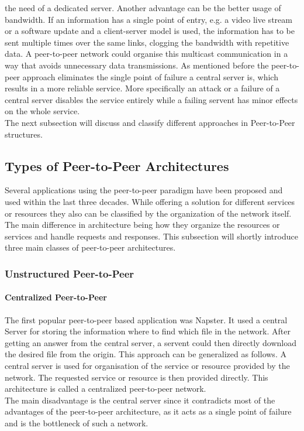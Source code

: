 the need of a dedicated server. Another advantage can be the better
usage of bandwidth. If an information has a single point of entry,
e.g. a video live stream or a software update and a client-server model is used,
the information has to be sent multiple times over the same links, clogging the
bandwidth with repetitive data. A peer-to-peer network could organise this
multicast communication in a way that avoids unnecessary data transmissions. As
mentioned before the peer-to-peer approach eliminates the single point of
failure a central server is, which results in a more reliable service. More
specifically an attack or a failure of a central server disables the service
entirely while a failing servent has minor effects on the whole service.
\\
The next subsection will discuss and classify different approaches in Peer-to-Peer
structures.
\subsection{Types of Peer-to-Peer Architectures}
Several applications using the peer-to-peer paradigm have been proposed and used
within the last three decades. While offering a solution for different services
or resources they also can be classified by the organization of the network
itself. The main difference in architecture being how they organize the
resources or services and handle requests and responses. This subsection will
shortly introduce three main classes of peer-to-peer architectures.
\subsubsection{Unstructured Peer-to-Peer}
\paragraph{Centralized Peer-to-Peer}
The first popular peer-to-peer based application was Napster. It used a
central Server for storing the information where to find which file in the
network. After getting an answer from the central server, a servent could then
directly download the desired file from the origin. This approach can be
generalized as follows. A central server is used for organisation
of the service or resource provided by the network. The requested service or
resource is then provided directly. This architecture is called a
centralized peer-to-peer network.
\\
The main disadvantage is the central server since it contradicts most of the
 advantages of the peer-to-peer architecture, as it acts as a single point of 
failure and is the bottleneck of such a network.
